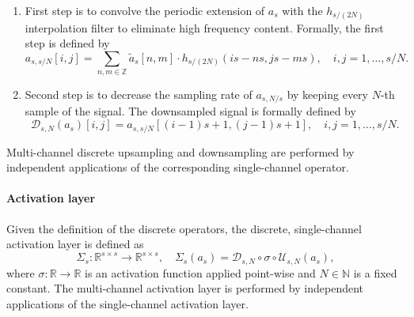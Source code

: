 \documentclass[reqno,10pt]{amsart}
\theoremstyle{plain}
\theoremstyle{definition}
\newcommand{\bb}[1]{\mathbb{#1}}
\newcommand{\cal}[1]{\mathcal{#1}}
\begin{document}
    \begin{enumerate}
        \item First step is to convolve the periodic extension of $a_s$ with the $h_{s/(2N)}$ interpolation filter to eliminate high frequency content. Formally, the first step is defined by
        $$ a_{s,s/N}[i,j] = \sum_{n,m \in \bb Z} \tilde{a}_s[n,m] \cdot h_{s/(2N)}(is-ns, js-ms), \quad i,j = 1,\dots, s/N.$$
        \item Second step is to decrease the sampling rate of $a_{s,N/s}$ by keeping every $N$-th sample of the signal. The downsampled signal is formally defined by
        $$ \cal D_{s,N}(a_s)[i,j] = a_{s,s/N}[(i-1)s+1, (j-1)s+1], \quad i,j = 1,\dots, s/N.$$
    \end{enumerate}
    Multi-channel discrete upsampling and downsampling are performed by independent applications of the corresponding single-channel operator.

    \paragraph{\bf Activation layer} Given the definition of the discrete operators, the discrete, single-channel activation layer is defined as
    $$\Sigma_s : \bb R^{s\times s} \to \bb R^{s\times s}, \quad \Sigma_s(a_s) = \cal D_{s,N} \circ \sigma \circ \cal U_{s,N}(a_s),$$
    where $\sigma : \bb R\to \bb R$ is an activation function applied point-wise and $N \in \bb N$ is a fixed constant. The multi-channel activation layer is performed by independent applications of the single-channel activation layer.
\end{document}
